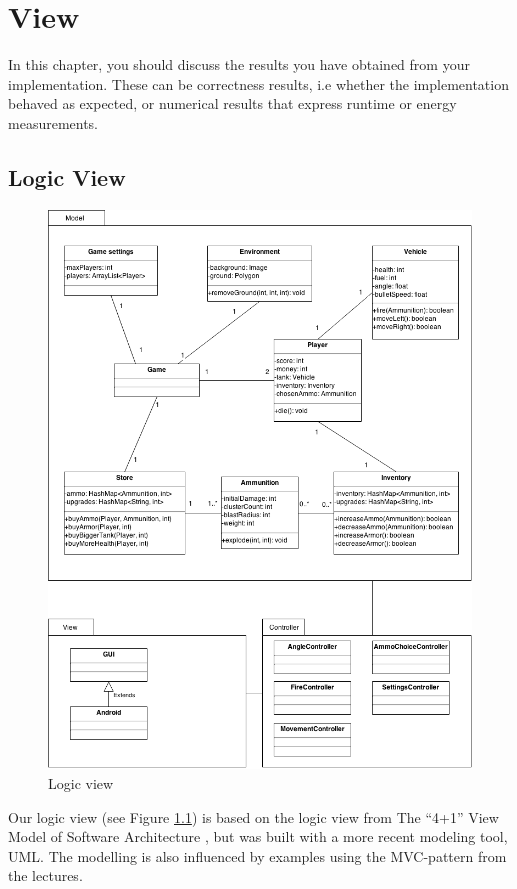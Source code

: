 \chapter{View}
In this chapter, you should discuss the results you have obtained from your implementation.
These can be correctness results, i.e whether the implementation behaved as expected, or numerical results that express runtime or energy measurements.

\section{Logic View}

\begin{figure}
\centering
\includegraphics[scale=0.4]{images/logic_view.png}
\caption{Logic view}
\label{fig:logic-view}
\end{figure}

Our logic view (see Figure \ref{fig:logic-view}) is based on the logic view from The “4+1” View Model of Software Architecture \cite{krutchen}, but was built with a more recent modeling tool, UML. The modelling is also influenced by examples using the MVC-pattern from the lectures.


